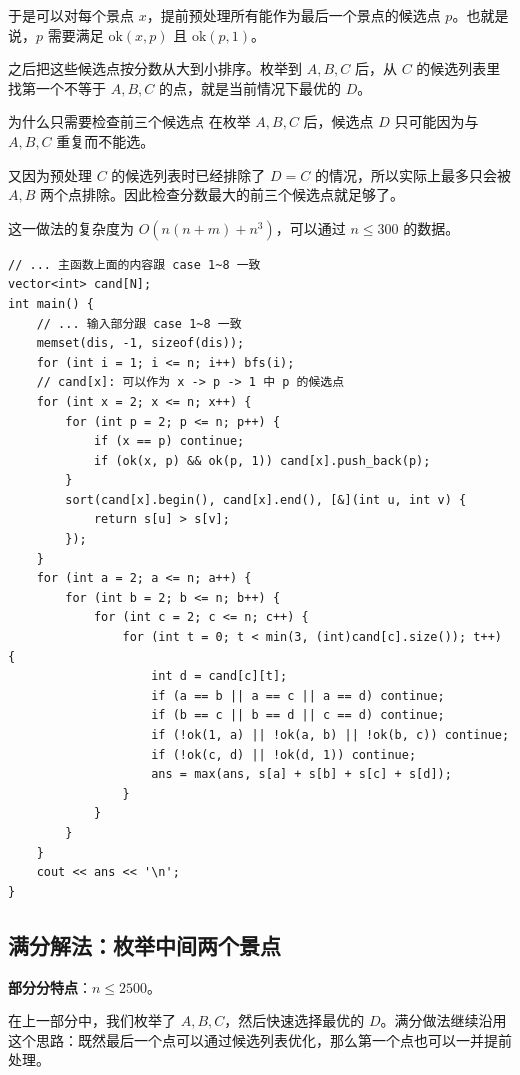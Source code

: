 \documentclass{book}
\begin{document}
于是可以对每个景点 $x$，提前预处理所有能作为最后一个景点的候选点 $p$。也就是说，$p$ 需要满足 $\mathrm{ok}(x,p)$ 且 $\mathrm{ok}(p,1)$。

之后把这些候选点按分数从大到小排序。枚举到 $A,B,C$ 后，从 $C$ 的候选列表里找第一个不等于 $A,B,C$ 的点，就是当前情况下最优的 $D$。

\begin{keybox}{为什么只需要检查前三个候选点}
在枚举 $A,B,C$ 后，候选点 $D$ 只可能因为与 $A,B,C$ 重复而不能选。

又因为预处理 $C$ 的候选列表时已经排除了 $D=C$ 的情况，所以实际上最多只会被 $A,B$ 两个点排除。因此检查分数最大的前三个候选点就足够了。
\end{keybox}

这一做法的复杂度为 $O(n(n+m)+n^3)$，可以通过 $n\le 300$ 的数据。

\newpage
\begin{lstlisting}[style = code]
// ... 主函数上面的内容跟 case 1~8 一致
vector<int> cand[N];
int main() {
    // ... 输入部分跟 case 1~8 一致
    memset(dis, -1, sizeof(dis));
    for (int i = 1; i <= n; i++) bfs(i);
    // cand[x]: 可以作为 x -> p -> 1 中 p 的候选点
    for (int x = 2; x <= n; x++) {
        for (int p = 2; p <= n; p++) {
            if (x == p) continue;
            if (ok(x, p) && ok(p, 1)) cand[x].push_back(p);
        }
        sort(cand[x].begin(), cand[x].end(), [&](int u, int v) {
            return s[u] > s[v];
        });
    }
    for (int a = 2; a <= n; a++) {
        for (int b = 2; b <= n; b++) {
            for (int c = 2; c <= n; c++) {
                for (int t = 0; t < min(3, (int)cand[c].size()); t++) {
                    int d = cand[c][t];
                    if (a == b || a == c || a == d) continue;
                    if (b == c || b == d || c == d) continue;
                    if (!ok(1, a) || !ok(a, b) || !ok(b, c)) continue;
                    if (!ok(c, d) || !ok(d, 1)) continue;
                    ans = max(ans, s[a] + s[b] + s[c] + s[d]);
                }
            }
        }
    }
    cout << ans << '\n';
}
\end{lstlisting}
\newpage
\subsection{满分解法：枚举中间两个景点}

\textbf{部分分特点}：$n\le 2500$。

在上一部分中，我们枚举了 $A,B,C$，然后快速选择最优的 $D$。满分做法继续沿用这个思路：既然最后一个点可以通过候选列表优化，那么第一个点也可以一并提前处理。
\end{document}
